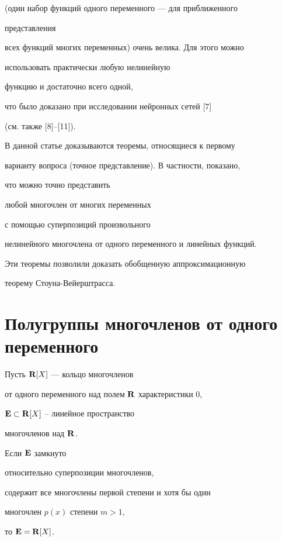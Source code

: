 (один набор функций одного переменного --- для приближенного


представления


всех функций многих переменных) очень велика. Для этого можно


использовать практически любую нелинейную


функцию и достаточно всего одной,


что было доказано при исследовании нейронных сетей [7]


(см. также [8]--[11]).





В данной статье доказываются теоремы, относящиеся к первому


варианту вопроса (точное представление). В частности, показано,


что можно точно представить


любой многочлен от многих переменных


с помощью суперпозиций произвольного


нелинейного многочлена от одного переменного и линейных функций.


Эти теоремы позволили доказать обобщенную аппроксимационную


теорему Стоуна-Вейерштрасса.





\section{Полугруппы многочленов от одного переменного}





Пусть ${\bold R}[X]$ --- кольцо многочленов


от одного переменного над полем ${\bold R}$ характеристики 0,


${\bold E} \subset {\bold R}[X]$ -- линейное пространство


многочленов над ${\bold R}$.





\begin{thm} Если ${\bold E}$ замкнуто


относительно суперпозиции многочленов,


содержит все многочлены первой степени и хотя бы один


многочлен $p(x)$ степени $m>1$,


то ${\bold E} = {\bold R}[X]$.


\end{thm}





